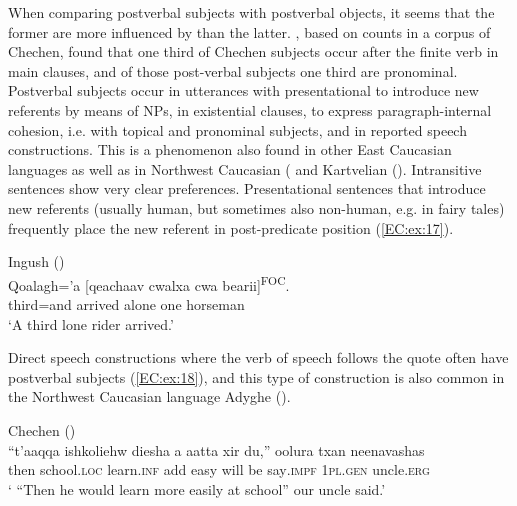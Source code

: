 \documentclass[output=paper,colorlinks,citecolor=brown,draftmode]{langscibook}
\begin{document}
When comparing postverbal subjects with postverbal objects, it seems that the former are more influenced by  than the latter. \citet{komen_post-verbal_2017}, based on counts in a corpus of Chechen, found that one third of Chechen subjects occur after the finite verb in main clauses, and of those post-verbal subjects one third are pronominal. Postverbal subjects occur in utterances with presentational  to introduce new referents by means of NPs, in existential clauses, to express paragraph-internal cohesion, i.e. with topical and pronominal subjects, and in reported speech constructions. This is a phenomenon also found in other East Caucasian languages as well as in Northwest Caucasian ( and Kartvelian (). Intransitive  sentences show very clear  preferences. Presentational sentences that introduce new referents (usually human, but sometimes also non-human, e.g. in fairy tales) frequently place the new referent in post-predicate position (\ref{EC:ex:17}).
 
\ea\label{EC:ex:17}
Ingush (\citealt{komen_post-verbal_2017}) \\
\gll Qoalagh='a [qeachaav cwalxa cwa bearii]\textsuperscript{FOC}. \\
third=and arrived alone one horseman \\
\glt `A third lone rider arrived.'
\z

Direct speech constructions where the verb of speech follows the quote often have postverbal subjects (\ref{EC:ex:18}), and this type of construction is also common in the Northwest Caucasian language Adyghe ().

\newpage
\ea\label{EC:ex:18}
Chechen ({\citealt{komen_post-verbal_2017}}) \\
\gll ``t'aaqqa ishkoliehw diesha a aatta xir du,'' oolura txan neenavashas \\
then school\textsc{.loc} learn\textsc{.inf} add easy will be say\textsc{.impf} \textsc{1pl.gen} uncle\textsc{.erg} \\
\glt ` ``Then he would learn more easily at school'' our uncle said.' 
\z
\end{document}
